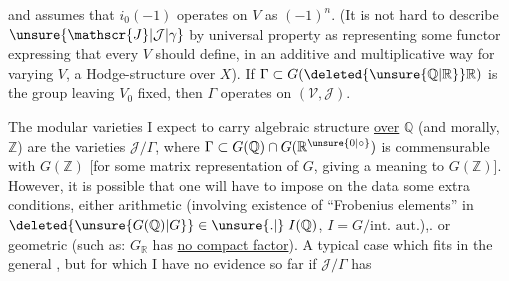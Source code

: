 and assumes that $i_0(-1)$ operates on $V$ as  $(-1)^n$. (It is not hard to describe $\unsure{\mathscr{J}|\mathcal{J}|\gamma}$ by universal property as  representing some functor  expressing that every $V$  should define, in an additive and multiplicative way for varying $V$, a Hodge-structure  over $X$). If $\Gamma\subset G(\deleted{\unsure{\mathbb{Q}|\mathbb{R}}}\mathbb{R})$ is the group leaving $V_0$ fixed, then $\Gamma$ operates on $(\mathscr{V},\mathscr{J})$.

The modular varieties I expect to carry algebraic structure \uline{over} $\mathbb{Q}$ (and morally, $\mathbb{Z}$) are the varieties $\boxed{\mathscr{J}/\Gamma}$, where $\Gamma\subset G(\mathbb{Q})\cap G(\mathbb{R}^{\unsure{0|\circ}})$  is commensurable with $G(\mathbb{Z})$ [for some matrix representation of $G$,  giving a meaning to $G(\mathbb{Z})$]. However, it is possible that one will have to impose on the data some extra conditions, either arithmetic (involving existence of ``Frobenius elements'' in $\deleted{\unsure{G(\mathbb{Q})|G}}\in\unsure{.|{}}\;I(\mathbb{Q})$, $I=G/\text{int. aut.}$),. or geometric  (such as: $G_{\mathbb{R}}$ has \uline{no compact factor}). A typical case which fits in the general  , but for which I have no evidence so far if $\mathscr{J}/\Gamma$ has
